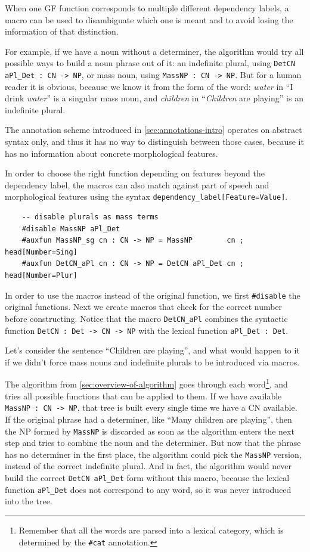 When one GF function corresponds to multiple different dependency labels, a macro can be used to disambiguate which one is meant and to avoid losing the information of that distinction.

For example, if we have a noun without a determiner, the algorithm would try all possible ways to build a noun phrase out of it: an indefinite plural, using \verb|DetCN aPl_Det : CN -> NP|, or mass noun, using \verb|MassNP : CN -> NP|. But for a human reader it is obvious, because we know it from the form of the word: \emph{water} in ``I drink \emph{water}'' is a singular mass noun, and \emph{children} in ``\emph{Children} are playing'' is an indefinite plural.

The annotation scheme introduced in \autoref{sec:annotations-intro} operates on abstract syntax only, and thus it has no way to distinguish between those cases, because it has no information about concrete morphological features.

In order to choose the right function depending on features beyond the dependency label, the macros can also match against part of speech and morphological features using the syntax \verb|dependency_label[Feature=Value]|.

\begin{lstlisting}
    -- disable plurals as mass terms
    #disable MassNP aPl_Det
    #auxfun MassNP_sg cn : CN -> NP = MassNP        cn ; head[Number=Sing]
    #auxfun DetCN_aPl cn : CN -> NP = DetCN aPl_Det cn ; head[Number=Plur]
\end{lstlisting}

In order to use the macros instead of the original function, we first \verb|#disable| the original functions.
Next we create macros that check for the correct number before constructing.
Notice that the macro \verb|DetCN_aPl| combines the syntactic function \verb|DetCN : Det -> CN -> NP| with the lexical function \verb|aPl_Det : Det|.

Let's consider the sentence ``Children are playing'', and what would happen to it if we didn't force mass nouns and indefinite plurals to be introduced via macros.

The algorithm from \autoref{sec:overview-of-algorithm} goes through each word\footnote{Remember that all the words are parsed into a lexical category, which is determined by the \texttt{\#cat} annotation.}, and tries all possible functions that can be applied to them. If we have available \verb|MassNP : CN -> NP|, that tree is built every single time we have a CN available.
If the original phrase had a determiner, like ``Many children are playing'', then the NP formed by \verb|MassNP| is discarded as soon as the algorithm enters the next step and tries to combine the noun and the determiner.
But now that the phrase has no determiner in the first place, the algorithm could pick the \verb|MassNP| version, instead of the correct indefinite plural. And in fact, the algorithm would never build the correct \verb|DetCN aPl_Det| form without this macro, because the lexical function \verb|aPl_Det| does not correspond to any word, so it was never introduced into the tree.


